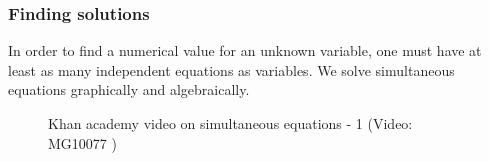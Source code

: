       \label{m39257*uid93}
            \subsubsection{ Finding solutions}
            \nopagebreak
        \label{m39257*id159052}In order to find a numerical value for an unknown variable, one must have at least as many independent equations as variables. We solve simultaneous equations graphically and algebraically.\par \label{m39257*eip-487}
    \setcounter{subfigure}{0}
	\begin{figure}[H] %
    \textnormal{Khan academy video on simultaneous equations - 1}\vspace{.1in} \nopagebreak
  \label{m39257*yt-media7}\label{m39257*yt-video7}
             { (Video:  MG10077 )}
      \vspace{2pt}
    \vspace{.1in}
 \end{figure}       \par 
 \label{m39257*uid97}
